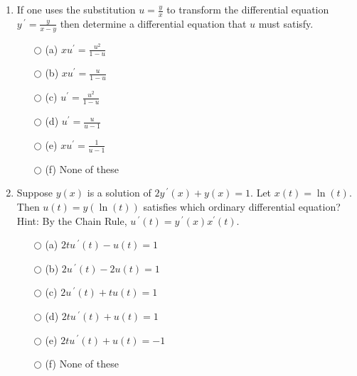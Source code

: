 \documentclass{ximera}
\begin{document}
\begin{enumerate}[label=(\arabic*)]


\newpage


\item If one uses the substitution $\displaystyle u=\frac{y}{x}$ to transform the differential equation\\ $\displaystyle y\,^{\prime}=\frac{y}{x-y}$ then determine a differential equation that $u$ must satisfy.

\begin{enumerate}[label=(\alph*)]
		\item[$\bigcirc$ (a)] $\displaystyle xu^{\prime}=\frac{u^2}{1-u}$   %
		\item[$\bigcirc$ (b)] $\displaystyle xu^{\prime}=\frac{u}{1-u}$
		\item[$\bigcirc$ (c)] $\displaystyle u^{\prime}=\frac{u^2}{1-u}$
 		\item[$\bigcirc$ (d)] $\displaystyle u^{\prime}=\frac{u}{u-1}$
		\item[$\bigcirc$ (e)] $\displaystyle xu^{\prime}=\frac{1}{u-1}$
		\item[$\bigcirc$ (f)] None of these
\end{enumerate}




\item Suppose $y(x)$ is a solution of $2 y\,^{\prime}(x) + y(x) = 1.$  Let $x(t) = \ln(t)$.  Then $u(t)=y(\ln{(t)})$ satisfies which ordinary differential equation?  Hint:  By the Chain Rule, $u\,^{\prime}(t)=y\,^{\prime}(x)x^{\prime}(t)$.


\begin{enumerate}[label=(\alph*)]
	\item[$\bigcirc$ (a)] $2 t u\,^{\prime}(t) - u(t) = 1$

	\item[$\bigcirc$ (b)] $2 u\,^{\prime}(t) - 2 u(t) = 1$

	\item[$\bigcirc$ (c)] $2 u\,^{\prime}(t) + t u(t) = 1$

	\item[$\bigcirc$ (d)] $2 t u\,^{\prime}(t) + u(t) = 1$  %

	\item[$\bigcirc$ (e)] $2 t u\,^{\prime}(t) + u(t) = -1$

	\item[$\bigcirc$ (f)] None of these
\end{enumerate}




\end{enumerate}
\end{document}
